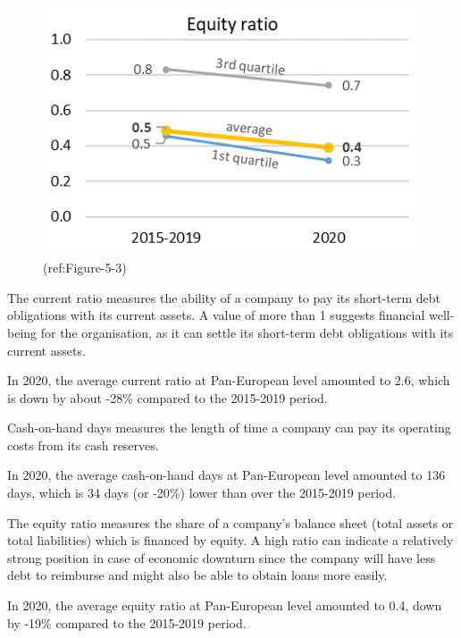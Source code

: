 \documentclass[
]{book}
\begin{document}
\begin{infobox}
\begin{left-narrow}
\begin{figure}
{\centering \includegraphics[width=1\linewidth]{figures/Figure-5-5} 

}

\caption{(ref:Figure-5-3)}\label{fig:figure21-bis}
\end{figure}

\end{left-narrow}

\begin{right-wide}
The current ratio measures the ability of a company to pay its
short-term debt obligations with its current assets. A value of more
than 1 suggests financial well-being for the organisation, as it can
settle its short-term debt obligations with its current assets.

In 2020, the average current ratio at Pan-European level amounted to
2.6, which is down by about -28\% compared to the 2015-2019 period.

Cash-on-hand days measures the length of time a company can pay its
operating costs from its cash reserves.

In 2020, the average cash-on-hand days at Pan-European level amounted to
136 days, which is 34 days (or -20\%) lower than over the 2015-2019
period.

The equity ratio measures the share of a company's balance sheet (total
assets or total liabilities) which is financed by equity. A high ratio
can indicate a relatively strong position in case of economic downturn
since the company will have less debt to reimburse and might also be
able to obtain loans more easily.

In 2020, the average equity ratio at Pan-European level amounted to 0.4,
down by -19\% compared to the 2015-2019 period.

\end{right-wide}

\end{infobox}
\end{document}
